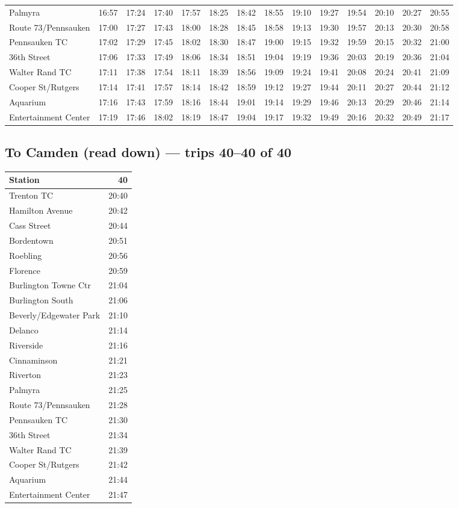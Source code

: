 \begin{center}
\begin{tabular}{@{}lrrrrrrrrrrrrr@{}}
Palmyra & 16:57 & 17:24 & 17:40 & 17:57 & 18:25 & 18:42 & 18:55 & 19:10 & 19:27 & 19:54 & 20:10 & 20:27 & 20:55 \\
Route 73/Pennsauken & 17:00 & 17:27 & 17:43 & 18:00 & 18:28 & 18:45 & 18:58 & 19:13 & 19:30 & 19:57 & 20:13 & 20:30 & 20:58 \\
Pennsauken TC & 17:02 & 17:29 & 17:45 & 18:02 & 18:30 & 18:47 & 19:00 & 19:15 & 19:32 & 19:59 & 20:15 & 20:32 & 21:00 \\
36th Street & 17:06 & 17:33 & 17:49 & 18:06 & 18:34 & 18:51 & 19:04 & 19:19 & 19:36 & 20:03 & 20:19 & 20:36 & 21:04 \\
Walter Rand TC & 17:11 & 17:38 & 17:54 & 18:11 & 18:39 & 18:56 & 19:09 & 19:24 & 19:41 & 20:08 & 20:24 & 20:41 & 21:09 \\
Cooper St/Rutgers & 17:14 & 17:41 & 17:57 & 18:14 & 18:42 & 18:59 & 19:12 & 19:27 & 19:44 & 20:11 & 20:27 & 20:44 & 21:12 \\
Aquarium & 17:16 & 17:43 & 17:59 & 18:16 & 18:44 & 19:01 & 19:14 & 19:29 & 19:46 & 20:13 & 20:29 & 20:46 & 21:14 \\
Entertainment Center & 17:19 & 17:46 & 18:02 & 18:19 & 18:47 & 19:04 & 19:17 & 19:32 & 19:49 & 20:16 & 20:32 & 20:49 & 21:17 \\
\bottomrule\end{tabular}\end{center}
\subsection*{To Camden (read down) --- trips 40--40 of 40}
\begin{center}\footnotesize\setlength{\tabcolsep}{3pt}\begin{tabular}{@{}lr@{}}\toprule
Station & 40 \\\midrule
Trenton TC & 20:40 \\
Hamilton Avenue & 20:42 \\
Cass Street & 20:44 \\
Bordentown & 20:51 \\
Roebling & 20:56 \\
Florence & 20:59 \\
Burlington Towne Ctr & 21:04 \\
Burlington South & 21:06 \\
Beverly/Edgewater Park & 21:10 \\
Delanco & 21:14 \\
Riverside & 21:16 \\
Cinnaminson & 21:21 \\
Riverton & 21:23 \\
Palmyra & 21:25 \\
Route 73/Pennsauken & 21:28 \\
Pennsauken TC & 21:30 \\
36th Street & 21:34 \\
Walter Rand TC & 21:39 \\
Cooper St/Rutgers & 21:42 \\
Aquarium & 21:44 \\
Entertainment Center & 21:47 \\
\bottomrule\end{tabular}\end{center}
\clearpage
